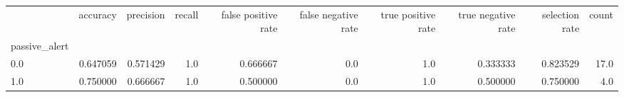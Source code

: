 \begin{tabular}{lrrrrrrrrr}
\toprule
{} &  accuracy &  precision &  recall &  false positive rate &  false negative rate &  true positive rate &  true negative rate &  selection rate &  count \\
passive\_alert &           &            &         &                      &                      &                     &                     &                 &        \\
\midrule
0.0           &  0.647059 &   0.571429 &     1.0 &             0.666667 &                  0.0 &                 1.0 &            0.333333 &        0.823529 &   17.0 \\
1.0           &  0.750000 &   0.666667 &     1.0 &             0.500000 &                  0.0 &                 1.0 &            0.500000 &        0.750000 &    4.0 \\
\bottomrule
\end{tabular}
